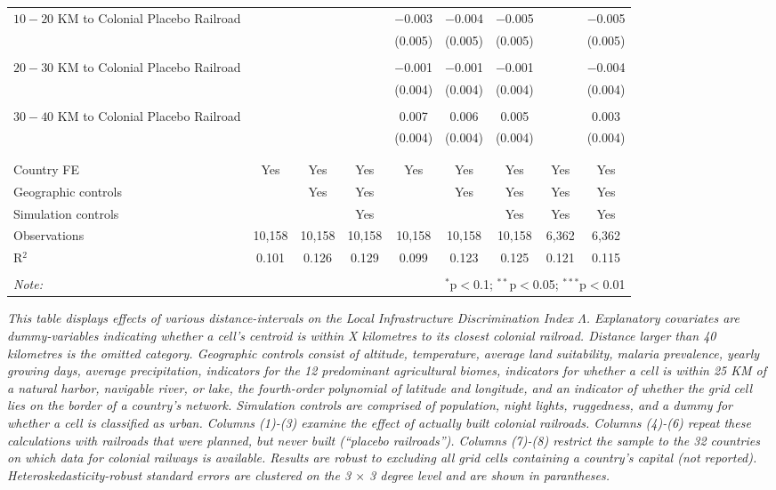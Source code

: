 \documentclass[11pt, oneside]{article}   	%
\newcommand{\mysubcaption}[1]{
\justify
\begin{spacing}{0.7}
\textit{\footnotesize #1}
\end{spacing}}
\begin{document}
\begin{table}[t]
{\begin{tabular}{@{\extracolsep{5pt}}lcccccccc}
   $10-20$ KM to Colonial Placebo Railroad &  &  &  & $-$0.003 & $-$0.004 & $-$0.005 &  & $-$0.005 \\
  &  &  &  & (0.005) & (0.005) & (0.005) &  & (0.005) \\
    & & & & & & & & \\
   $20-30$ KM to Colonial Placebo Railroad &  &  &  & $-$0.001 & $-$0.001 & $-$0.001 &  & $-$0.004 \\
  &  &  &  & (0.004) & (0.004) & (0.004) &  & (0.004) \\
    & & & & & & & & \\
   $30-40$ KM to Colonial Placebo Railroad &  &  &  & 0.007 & 0.006 & 0.005 &  & 0.003 \\
  &  &  &  & (0.004) & (0.004) & (0.004) &  & (0.004) \\
    & & & & & & & & \\
  \hline \\[-1.8ex]
  Country FE & Yes & Yes & Yes & Yes & Yes & Yes & Yes & Yes \\
  Geographic controls &  & Yes & Yes &  & Yes & Yes & Yes & Yes \\
  Simulation controls &  &  & Yes &  &  & Yes & Yes & Yes \\
  Observations & 10,158 & 10,158 & 10,158 & 10,158 & 10,158 & 10,158 & 6,362 & 6,362 \\
  R$^{2}$ & 0.101 & 0.126 & 0.129 & 0.099 & 0.123 & 0.125 & 0.121 & 0.115 \\
  \hline
  \hline \\[-1.8ex]
  \textit{Note:}  & \multicolumn{8}{r}{$^{*}$p$<$0.1; $^{**}$p$<$0.05; $^{***}$p$<$0.01} \\
  \end{tabular}

}

\mysubcaption{This table displays effects of various distance-intervals on the Local Infrastructure Discrimination Index $\Lambda$. Explanatory covariates are dummy-variables indicating whether a cell's centroid is within X kilometres to its closest colonial railroad. Distance larger than 40 kilometres is the omitted category. Geographic controls consist of altitude, temperature, average land suitability, malaria prevalence, yearly growing days, average precipitation, indicators for the 12 predominant agricultural biomes, indicators for whether a cell is within 25 KM of a natural harbor, navigable river, or lake, the fourth-order polynomial of latitude and longitude, and an indicator of whether the grid cell lies on the border of a country's network. Simulation controls are comprised of population, night lights, ruggedness, and a dummy for whether a cell is classified as urban. Columns (1)-(3) examine the effect of actually built colonial railroads. Columns (4)-(6) repeat these calculations with railroads that were planned, but never built (``placebo railroads''). Columns (7)-(8) restrict the sample to the 32 countries on which data for colonial railways is available. Results are robust to excluding all grid cells containing a country's capital (not reported). Heteroskedasticity-robust standard errors are clustered on the 3 $\times$ 3 degree level and are shown in parantheses.}
\end{table}
\end{document}

